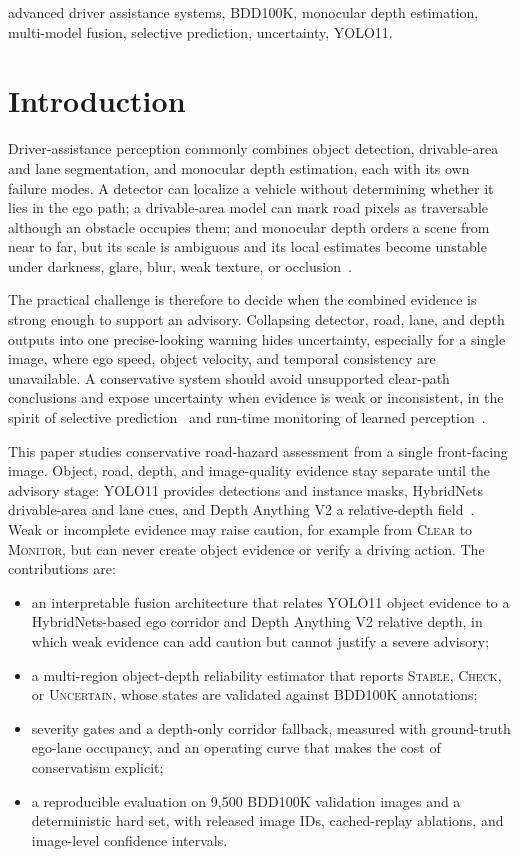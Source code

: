 \documentclass[conference,a4paper]{IEEEtran}
\newcommand{\st}[1]{\textsc{#1}}
\begin{document}
\begin{IEEEkeywords}
advanced driver assistance systems, BDD100K, monocular depth estimation, multi-model fusion, selective prediction, uncertainty, YOLO11.
\end{IEEEkeywords}

\section{Introduction}
Driver-assistance perception commonly combines object detection, drivable-area and lane segmentation, and monocular depth estimation, each with its own failure modes. A detector can localize a vehicle without determining whether it lies in the ego path; a drivable-area model can mark road pixels as traversable although an obstacle occupies them; and monocular depth orders a scene from near to far, but its scale is ambiguous and its local estimates become unstable under darkness, glare, blur, weak texture, or occlusion~\cite{bdd100k,dav2}.

The practical challenge is therefore to decide when the combined evidence is strong enough to support an advisory. Collapsing detector, road, lane, and depth outputs into one precise-looking warning hides uncertainty, especially for a single image, where ego speed, object velocity, and temporal consistency are unavailable. A conservative system should avoid unsupported clear-path conclusions and expose uncertainty when evidence is weak or inconsistent, in the spirit of selective prediction~\cite{geifman2017} and run-time monitoring of learned perception~\cite{rahman2021}.

This paper studies conservative road-hazard assessment from a single front-facing image. Object, road, depth, and image-quality evidence stay separate until the advisory stage: YOLO11 provides detections and instance masks, HybridNets drivable-area and lane cues, and Depth Anything V2 a relative-depth field~\cite{dav2,hybridnets,ultralytics}. Weak or incomplete evidence may raise caution, for example from \st{Clear} to \st{Monitor}, but can never create object evidence or verify a driving action. The contributions are:
\begin{itemize}
\item an interpretable fusion architecture that relates YOLO11 object evidence to a HybridNets-based ego corridor and Depth Anything V2 relative depth, in which weak evidence can add caution but cannot justify a severe advisory;
\item a multi-region object-depth reliability estimator that reports \st{Stable}, \st{Check}, or \st{Uncertain}, whose states are validated against BDD100K annotations;
\item severity gates and a depth-only corridor fallback, measured with ground-truth ego-lane occupancy, and an operating curve that makes the cost of conservatism explicit;
\item a reproducible evaluation on 9{,}500 BDD100K validation images and a deterministic hard set, with released image IDs, cached-replay ablations, and image-level confidence intervals.
\end{itemize}
\end{document}
